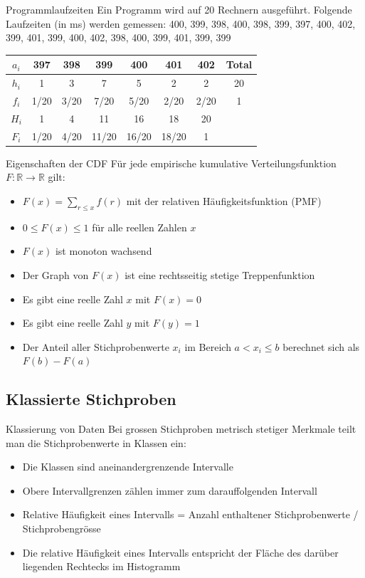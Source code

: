 \begin{example2}{Programmlaufzeiten}
Ein Programm wird auf 20 Rechnern ausgeführt. Folgende Laufzeiten (in ms) werden gemessen:
400, 399, 398, 400, 398, 399, 397, 400, 402, 399, 401, 399, 400, 402, 398, 400, 399, 401, 399, 399

\begin{center}
\begin{tabular}{|c|c|c|c|c|c|c|c|}
\hline
$a_i$ & 397 & 398 & 399 & 400 & 401 & 402 & Total \\
\hline
$h_i$ & 1 & 3 & 7 & 5 & 2 & 2 & 20 \\
\hline
$f_i$ & 1/20 & 3/20 & 7/20 & 5/20 & 2/20 & 2/20 & 1 \\
\hline
$H_i$ & 1 & 4 & 11 & 16 & 18 & 20 & \\
\hline
$F_i$ & 1/20 & 4/20 & 11/20 & 16/20 & 18/20 & 1 & \\
\hline
\end{tabular}
\end{center}
\end{example2}

\begin{concept}{Eigenschaften der CDF}
Für jede empirische kumulative Verteilungsfunktion $F: \mathbb{R} \rightarrow \mathbb{R}$ gilt:
\begin{itemize}
    \item $F(x) = \sum_{r\leq x} f(r)$ mit der relativen Häufigkeitsfunktion (PMF)
    \item $0 \leq F(x) \leq 1$ für alle reellen Zahlen $x$
    \item $F(x)$ ist monoton wachsend
    \item Der Graph von $F(x)$ ist eine rechtsseitig stetige Treppenfunktion
    \item Es gibt eine reelle Zahl $x$ mit $F(x) = 0$
    \item Es gibt eine reelle Zahl $y$ mit $F(y) = 1$
    \item Der Anteil aller Stichprobenwerte $x_i$ im Bereich $a < x_i \leq b$ berechnet sich als $F(b) - F(a)$
\end{itemize}
\end{concept}

\subsection{Klassierte Stichproben}

\begin{definition}{Klassierung von Daten}
Bei grossen Stichproben metrisch stetiger Merkmale teilt man die Stichprobenwerte in Klassen ein:
\begin{itemize}
    \item Die Klassen sind aneinandergrenzende Intervalle
    \item Obere Intervallgrenzen zählen immer zum darauffolgenden Intervall
    \item Relative Häufigkeit eines Intervalls = Anzahl enthaltener Stichprobenwerte / Stichprobengrösse
    \item Die relative Häufigkeit eines Intervalls entspricht der Fläche des darüber liegenden Rechtecks im Histogramm
\end{itemize}
\end{definition}

